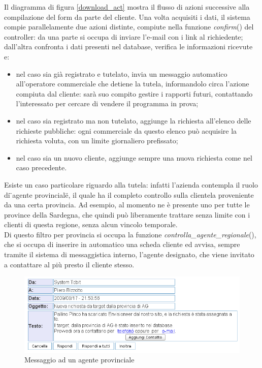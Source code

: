 \noindent
Il diagramma di figura \ref{download_act} mostra il flusso di azioni successive alla compilazione del form da parte del cliente. Una volta acquisiti i dati, il sistema compie parallelamente due azioni distinte, compiute nella funzione \textit{confirm}() del controller: da una parte si occupa di inviare l'e-mail con i link al richiedente; dall'altra confronta i dati presenti nel database, verifica le informazioni ricevute e:

\begin{itemize}
 \item nel caso sia gi\`a registrato e tutelato, invia un messaggio automatico all'operatore commerciale che detiene la tutela, informandolo circa l'azione compiuta dal cliente: sar\`a suo compito gestire i rapporti futuri, contattando l'interessato per cercare di vendere il programma in prova;
 \item nel caso sia registrato ma non tutelato, aggiunge la richiesta all'elenco delle richieste pubbliche: ogni commerciale da questo elenco pu\`o acquisire la richiesta voluta, con un limite giornaliero prefissato;
 \item nel caso sia un nuovo cliente, aggiunge sempre una nuova richiesta come nel caso precedente.
\end{itemize}
\noindent
Esiste un caso particolare riguardo alla tutela: infatti l'azienda contempla il ruolo di \"{}agente provinciale\"{}, il quale ha il completo controllo sulla clientela proveniente da una certa provincia. Ad esempio, al momento ne \`e presente uno per tutte le province della Sardegna, che quindi pu\`o liberamente trattare senza limite con i clienti di questa regione, senza alcun vincolo temporale.\\
Di questo filtro per provincia si occupa la funzione \textit{controlla\_{}agente\_{}regionale}(), che si occupa di inserire in automatico una scheda cliente ed avvisa, sempre tramite il sistema di messaggistica interno, l'agente designato, che viene invitato a contattare al pi\`u presto il cliente stesso.

\begin{figure}[!ht]
\centering
  \includegraphics[scale=0.5]{./images/messaggioAgenteScreen.png}
\caption{Messaggio ad un agente provinciale}
\label{agent_message}
\end{figure}

